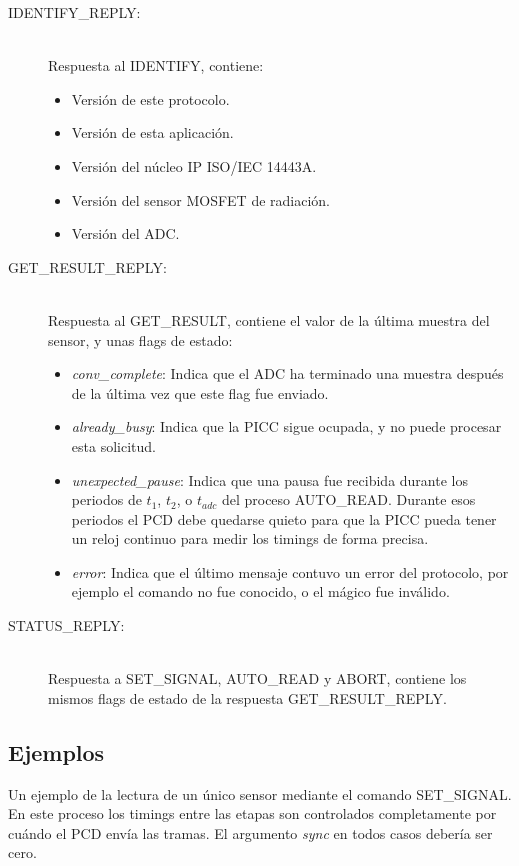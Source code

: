 \documentclass[a4paper, twoside, 11pt]{report}
\begin{document}
\begin{description}
  \item [IDENTIFY\_REPLY:] \hfill \\ Respuesta al IDENTIFY, contiene:
  \begin{itemize}
    \item Versión de este protocolo.
    \item Versión de esta aplicación.
    \item Versión del núcleo IP ISO/IEC 14443A.
    \item Versión del sensor MOSFET de radiación.
    \item Versión del ADC.
  \end{itemize}
  \item [GET\_RESULT\_REPLY:] \hfill \\ Respuesta al GET\_RESULT, contiene el valor de la última muestra del sensor, y unas flags de estado:
  \begin{itemize}
    \item \textit{conv\_complete}: Indica que el ADC ha terminado una muestra después de la última vez que este flag fue enviado.
    \item \textit{already\_busy}: Indica que la PICC sigue ocupada, y no puede procesar esta solicitud.
    \item \textit{unexpected\_pause}: Indica que una pausa fue recibida durante los periodos de $t_1$, $t_2$, o $t_{adc}$ del proceso AUTO\_READ. Durante esos periodos el PCD debe quedarse quieto para que la PICC pueda tener un reloj continuo para medir los timings de forma precisa.
    \item \textit{error}: Indica que el último mensaje contuvo un error del protocolo, por ejemplo el comando no fue conocido, o el mágico fue inválido.
  \end{itemize}
  \item [STATUS\_REPLY:] \hfill \\ Respuesta a SET\_SIGNAL, AUTO\_READ y ABORT, contiene los mismos flags de estado de la respuesta GET\_RESULT\_REPLY.
\end{description}

\FloatBarrier
\subsection{Ejemplos}

Un ejemplo de la lectura de un único sensor mediante el comando SET\_SIGNAL. En este proceso los timings entre las etapas son controlados completamente por cuándo el PCD envía las tramas. El argumento \textit{sync} en todos casos debería ser cero.
\end{document}
